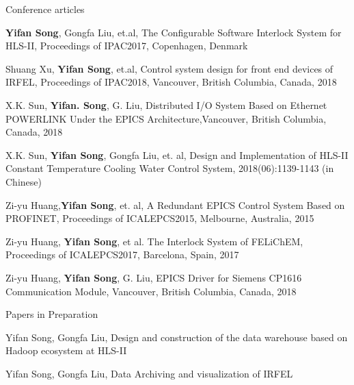 \begin{cventries}
\cventry
   {Conference articles} %
   {} %
   {} %
   {} %
   {
   	\begin{cvitems} %
   		\item {\textbf{Yifan Song}, Gongfa Liu, et.al, The Configurable Software Interlock System for HLS-II, Proceedings of IPAC2017, Copenhagen, Denmark}
   		\item {Shuang Xu, \textbf{Yifan Song}, et.al, Control system design for front end devices of IRFEL, Proceedings of IPAC2018, Vancouver, British Columbia, Canada, 2018}
   		\item{X.K. Sun, \textbf{Yifan. Song}, G. Liu, Distributed I/O System Based on Ethernet POWERLINK Under the EPICS Architecture,Vancouver, British Columbia, Canada, 2018}
   		\item{X.K. Sun, \textbf{Yifan Song}, Gongfa Liu, et. al, Design and Implementation of HLS-II Constant Temperature Cooling Water Control System, 2018(06):1139-1143 (in Chinese)}
   		\item {Zi-yu Huang,\textbf{Yifan Song}, et. al, A Redundant EPICS Control System Based on PROFINET, Proceedings of ICALEPCS2015, Melbourne, Australia, 2015}
   		\item {Zi-yu Huang, \textbf{Yifan Song}, et al. The Interlock System of FELiChEM, Proceedings of ICALEPCS2017, Barcelona, Spain, 2017}
   		\item {Zi-yu Huang, \textbf{Yifan Song}, G. Liu, EPICS Driver for Siemens CP1616 Communication Module, Vancouver, British Columbia, Canada, 2018}
   	\end{cvitems}
   }

  \cventry
    {Papers in Preparation} %
    {} %
    {} %
    {} %
    {
      \begin{cvitems} %
        \item {Yifan Song, Gongfa Liu, Design and construction of the data warehouse based on Hadoop ecosystem at HLS-II}
        \item {Yifan Song, Gongfa Liu, Data Archiving and visualization of IRFEL}
      \end{cvitems}
    }
   
\end{cventries}
